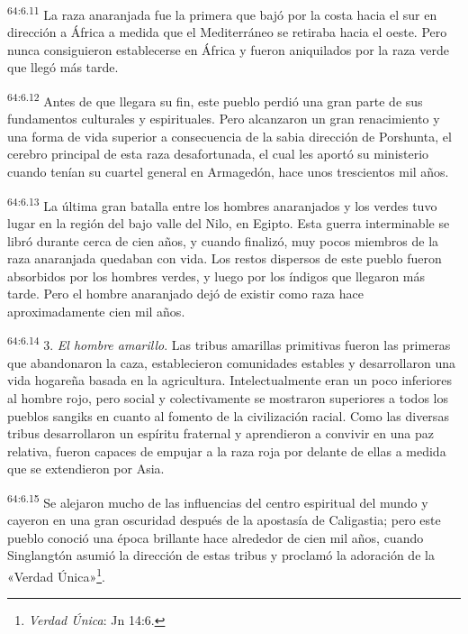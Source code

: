 \par
\textsuperscript{64:6.11} La raza anaranjada fue la primera que bajó por la costa hacia el sur en dirección a África a medida que el Mediterráneo se retiraba hacia el oeste. Pero nunca consiguieron establecerse en África y fueron aniquilados por la raza verde que llegó más tarde.

\par
\textsuperscript{64:6.12} Antes de que llegara su fin, este pueblo perdió una gran parte de sus fundamentos culturales y espirituales. Pero alcanzaron un gran renacimiento y una forma de vida superior a consecuencia de la sabia dirección de Porshunta, el cerebro principal de esta raza desafortunada, el cual les aportó su ministerio cuando tenían su cuartel general en Armagedón, hace unos trescientos mil años.

\par
\textsuperscript{64:6.13} La última gran batalla entre los hombres anaranjados y los verdes tuvo lugar en la región del bajo valle del Nilo, en Egipto. Esta guerra interminable se libró durante cerca de cien años, y cuando finalizó, muy pocos miembros de la raza anaranjada quedaban con vida. Los restos dispersos de este pueblo fueron absorbidos por los hombres verdes, y luego por los índigos que llegaron más tarde. Pero el hombre anaranjado dejó de existir como raza hace aproximadamente cien mil años.

\par
\textsuperscript{64:6.14} 3. \textit{El hombre amarillo}. Las tribus amarillas primitivas fueron las primeras que abandonaron la caza, establecieron comunidades estables y desarrollaron una vida hogareña basada en la agricultura. Intelectualmente eran un poco inferiores al hombre rojo, pero social y colectivamente se mostraron superiores a todos los pueblos sangiks en cuanto al fomento de la civilización racial. Como las diversas tribus desarrollaron un espíritu fraternal y aprendieron a convivir en una paz relativa, fueron capaces de empujar a la raza roja por delante de ellas a medida que se extendieron por Asia.

\par
\textsuperscript{64:6.15} Se alejaron mucho de las influencias del centro espiritual del mundo y cayeron en una gran oscuridad después de la apostasía de Caligastia; pero este pueblo conoció una época brillante hace alrededor de cien mil años, cuando Singlangtón asumió la dirección de estas tribus y proclamó la adoración de la «Verdad Única»\footnote{\textit{Verdad Única}: Jn 14:6.}.

